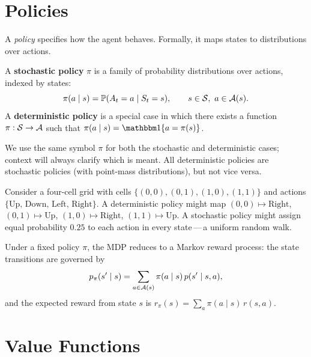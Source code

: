 \section{Policies}
\label{sec:policies}

A \emph{policy} specifies how the agent behaves. Formally, it maps states to distributions over actions.

\begin{definition}[Policy]
\label{def:policy}
A \textbf{stochastic policy} $\pi$ is a family of probability distributions over actions, indexed by states:
\begin{equation}
\label{eq:policy}
\pi(a \mid s) = \mathbb{P}(A_t = a \mid S_t = s), \qquad s \in \mathcal{S},\ a \in \mathcal{A}(s).
\end{equation}
A \textbf{deterministic policy} is a special case in which there exists a function $\pi : \mathcal{S} \to \mathcal{A}$ such that $\pi(a \mid s) = \ind\{a = \pi(s)\}$.
\end{definition}

\begin{remark}
We use the same symbol $\pi$ for both the stochastic and deterministic cases; context will always clarify which is meant. All deterministic policies are stochastic policies (with point-mass distributions), but not vice versa.
\end{remark}

\begin{example}
\label{ex:policy-gridworld}
Consider a four-cell grid with cells $\{(0,0),(0,1),(1,0),(1,1)\}$ and actions $\{\text{Up, Down, Left, Right}\}$. A deterministic policy might map $(0,0) \mapsto \text{Right}$, $(0,1) \mapsto \text{Up}$, $(1,0) \mapsto \text{Right}$, $(1,1)\mapsto\text{Up}$. A stochastic policy might assign equal probability $0.25$ to each action in every state\,---\,a uniform random walk.
\end{example}

Under a fixed policy $\pi$, the MDP reduces to a Markov reward process: the state transitions are governed by
\[
p_\pi(s' \mid s) = \sum_{a \in \mathcal{A}(s)} \pi(a \mid s)\, p(s' \mid s, a),
\]
and the expected reward from state $s$ is $r_\pi(s) = \sum_{a} \pi(a \mid s)\, r(s, a)$.


\section{Value Functions}
\label{sec:value-functions}

